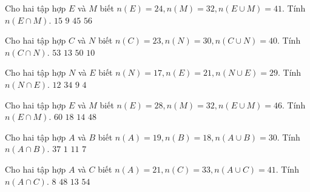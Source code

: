 \begin{ex}
 Cho hai tập hợp ${E}$ và ${M}$ biết $n(E)=24,n(M)=32, n(E\cup M)=41$. Tính $n(E\cap M)$. 
\choice
{ \True ${15}$ }
   { ${9}$ }
     { ${45}$ }
    { ${56}$ }
\end{ex}

\begin{ex}
 Cho hai tập hợp ${C}$ và ${N}$ biết $n(C)=23,n(N)=30, n(C\cup N)=40$. Tính $n(C\cap N)$. 
\choice
{ ${53}$ }
   { \True ${13}$ }
     { ${50}$ }
    { ${10}$ }
\end{ex}

\begin{ex}
 Cho hai tập hợp ${N}$ và ${E}$ biết $n(N)=17,n(E)=21, n(N\cup E)=29$. Tính $n(N\cap E)$. 
\choice
{ ${12}$ }
   { ${34}$ }
     { \True ${9}$ }
    { ${4}$ }
\end{ex}

\begin{ex}
 Cho hai tập hợp ${E}$ và ${M}$ biết $n(E)=28,n(M)=32, n(E\cup M)=46$. Tính $n(E\cap M)$. 
\choice
{ ${60}$ }
   { ${18}$ }
     { \True ${14}$ }
    { ${48}$ }
\end{ex}

\begin{ex}
 Cho hai tập hợp ${A}$ và ${B}$ biết $n(A)=19,n(B)=18, n(A\cup B)=30$. Tính $n(A\cap B)$. 
\choice
{ ${37}$ }
   { ${1}$ }
     { ${11}$ }
    { \True ${7}$ }
\end{ex}

\begin{ex}
 Cho hai tập hợp ${A}$ và ${C}$ biết $n(A)=21,n(C)=33, n(A\cup C)=41$. Tính $n(A\cap C)$. 
\choice
{ ${8}$ }
   { ${48}$ }
     { \True ${13}$ }
    { ${54}$ }
\end{ex}

